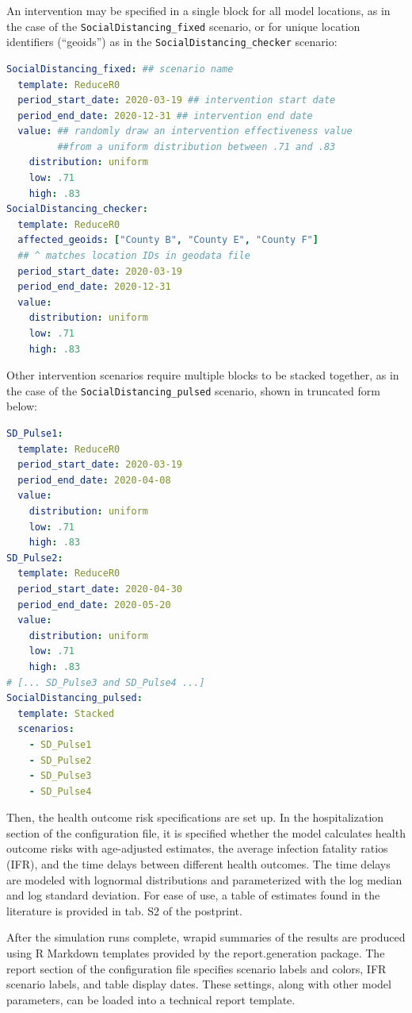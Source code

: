 An intervention may be specified in a single block for all model locations, as in the case of the \verb|SocialDistancing_fixed| scenario, or for unique location identifiers (“geoids”) as in the \verb|SocialDistancing_checker| scenario:
\begin{lstlisting}[language=yaml]
SocialDistancing_fixed: ## scenario name 
  template: ReduceR0 
  period_start_date: 2020-03-19 ## intervention start date 
  period_end_date: 2020-12-31 ## intervention end date 
  value: ## randomly draw an intervention effectiveness value 
         ##from a uniform distribution between .71 and .83 
    distribution: uniform 
    low: .71 
    high: .83 
SocialDistancing_checker: 
  template: ReduceR0 
  affected_geoids: ["County B", "County E", "County F"] 
  ## ^ matches location IDs in geodata file 
  period_start_date: 2020-03-19 
  period_end_date: 2020-12-31 
  value: 
    distribution: uniform 
    low: .71
    high: .83
\end{lstlisting}

Other intervention scenarios require multiple blocks to be stacked together, as in the case of the \verb|SocialDistancing_pulsed| scenario, shown in truncated form below: 

\begin{lstlisting}[language=yaml]
SD_Pulse1: 
  template: ReduceR0 
  period_start_date: 2020-03-19 
  period_end_date: 2020-04-08 
  value: 
    distribution: uniform 
    low: .71 
    high: .83 
SD_Pulse2: 
  template: ReduceR0 
  period_start_date: 2020-04-30 
  period_end_date: 2020-05-20 
  value: 
    distribution: uniform
    low: .71 
    high: .83 
# [... SD_Pulse3 and SD_Pulse4 ...]
SocialDistancing_pulsed: 
  template: Stacked 
  scenarios: 
    - SD_Pulse1 
    - SD_Pulse2
    - SD_Pulse3
    - SD_Pulse4
\end{lstlisting}

Then, the health outcome risk specifications are set up. In the hospitalization section of the configuration file, it is specified whether the model calculates health outcome risks with age-adjusted estimates, the average infection fatality ratios (IFR), and the time delays between different health outcomes. The time delays are modeled with lognormal distributions and parameterized with the log median and log standard deviation. For ease of use, a table of estimates found in the literature is provided in tab. S2 of the postprint.

After the simulation runs complete, wrapid summaries of the results are produced using R Markdown templates provided by the report.generation package. The report section of the configuration file specifies scenario labels and colors, IFR scenario labels, and table display dates. These settings, along with other model parameters, can be loaded into a technical report template.

